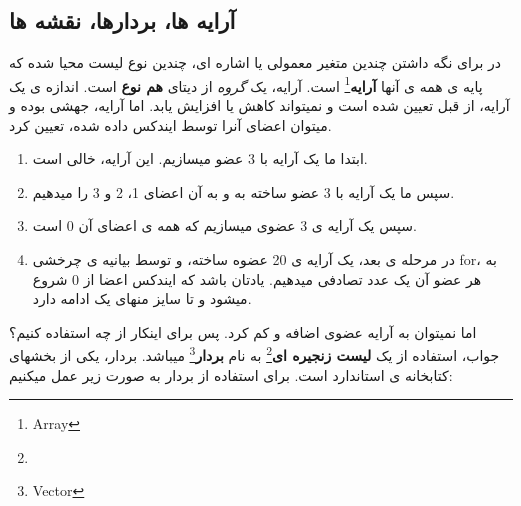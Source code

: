\documentclass[14pt,a4paper]{memoir}
\begin{document}
\subsection{آرایه ها، بردارها، نقشه ها}\label{cpparr}
	 
	 در  برای نگه داشتن چندین متغیر معمولی یا اشاره ای، چندین نوع لیست محیا شده که پایه ی همه ی آنها \textbf{آرایه}\footnote{Array} است. آرایه، یک \textit{گروه} از دیتای \textbf{هم نوع} است. اندازه ی یک آرایه، از قبل تعیین شده است و نمیتواند کاهش یا افزایش یابد. اما آرایه، جهشی بوده و میتوان اعضای آنرا توسط ایندکس داده شده، تعیین کرد.
	 
	 
	 
	 
	 	 	 
	 \begin{latin}
	 	
	 \end{latin}
	 
	 
	 
	 \begin{enumerate}
	 	\item ابتدا ما یک آرایه  با 3 عضو میسازیم. این آرایه، خالی است.
	 	\item سپس ما یک آرایه با 3 عضو ساخته به و به آن اعضای 1، 2 و 3 را میدهیم.
	 	\item  سپس یک آرایه ی 3 عضوی میسازیم که همه ی اعضای آن 0 است.
	 	
	 	\item  در مرحله ی بعد، یک آرایه ی 20 عضوه ساخته، و توسط بیانیه ی چرخشی for، به هر عضو آن یک عدد تصادفی میدهیم. یادتان باشد که ایندکس اعضا از 0 شروع میشود و تا سایز منهای یک ادامه دارد.
	 \end{enumerate}
 
 اما نمیتوان به آرایه عضوی اضافه و کم کرد. پس برای اینکار از چه استفاده کنیم؟ جواب، استفاده از یک \textbf{لیست زنجیره ای}\footnote{} به نام \textbf{بردار}\footnote{Vector} میباشد. بردار، یکی از بخشهای کتابخانه ی استاندارد است. برای استفاده از بردار به صورت زیر عمل میکنیم:
 
 
	 	 \begin{latin}
	 	
	 \end{latin}
	 
\end{document}
